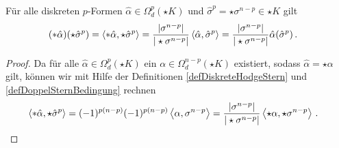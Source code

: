   \begin{folgerung}
    Für alle diskreten \( p \)-Formen \( \hat\alpha\in\Omega^{p}_{d}(\star K) \) und \( \hat\sigma^{p}=\star\sigma^{n-p}\in\star K \) gilt
    \begin{align}
      (*\hat\alpha)(\star\hat\sigma^{p}) &= \left\langle *\hat\alpha, \star\hat\sigma^{p} \right\rangle 
                                        = \frac{|\sigma^{n-p}|}{|\star\sigma^{n-p}|} \left\langle \hat\alpha, \hat\sigma^{p} \right\rangle
                                         = \frac{|\sigma^{n-p}|}{|\star\sigma^{n-p}|} \hat\alpha(\hat\sigma^{p}) \,\text{.}
    \end{align}
  \end{folgerung}
  \begin{proof}
    Da für alle \( \hat\alpha\in\Omega^{p}_{d}(\star K) \) ein \( \alpha\in\Omega^{n-p}_{d}(\star K) \) existiert,
    sodass \( \hat\alpha = \star\alpha \) gilt, können wir mit Hilfe der Definitionen \ref{defDiskreteHodgeStern} und \ref{defDoppelSternBedingung} rechnen
    \begin{align}
      \left\langle *\hat\alpha, \star\hat\sigma^{p} \right\rangle
        &= (-1)^{p(n-p)} (-1)^{p(n-p)} \left\langle \alpha , \sigma^{n-p} \right\rangle
         = \frac{|\sigma^{n-p}|}{|\star\sigma^{n-p}|} \left\langle \star\alpha, \star\sigma^{n-p} \right\rangle \,\text{.}
    \end{align}
  \end{proof}
  
